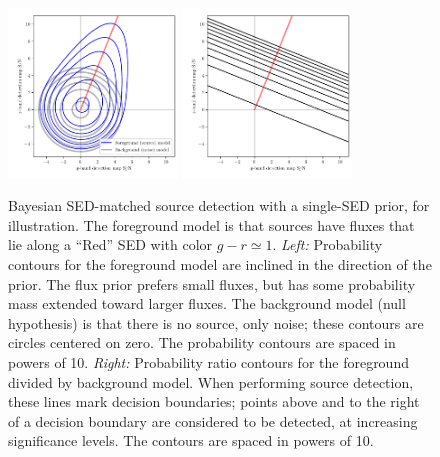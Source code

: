 \documentclass[11pt,letterpaper,linenumbers]{aastex63}
\begin{document}
\begin{figure}
  \begin{center}
    \includegraphics[width=0.4\textwidth]{prob-contours-a}
    \includegraphics[width=0.4\textwidth]{prob-rel-a}
    \caption{Bayesian SED-matched source detection with a single-SED prior, for illustration.
      The foreground model is that sources have fluxes that lie along a ``Red''
      SED with color $g-r \simeq 1$.
      \emph{Left:} Probability contours for the foreground model are inclined in the
      direction of the prior.  The flux prior prefers small fluxes, but has some
      probability mass extended toward larger fluxes.
      The background model (null hypothesis) is that there is no source, only noise; these
      contours are circles centered on zero.
      The probability contours are spaced in powers of 10.
      \emph{Right:} Probability ratio contours for the
      foreground divided by background model.
      When performing source detection, these lines mark decision boundaries;
      points above and to the right of a decision boundary are
      considered to be detected, at increasing significance levels.
      The contours are spaced in powers of 10.
      \label{fig:cona}
    }
    \end{center}
\end{figure}
\end{document}
